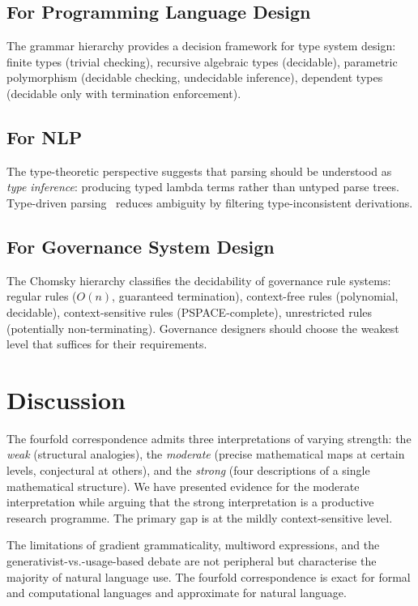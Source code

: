 \documentclass[12pt,a4paper]{article}
\begin{document}
\subsection{For Programming Language Design}

The grammar hierarchy provides a decision framework for type system design:
finite types (trivial checking), recursive algebraic types (decidable),
parametric polymorphism (decidable checking, undecidable inference), dependent
types (decidable only with termination enforcement).

\subsection{For NLP}

The type-theoretic perspective suggests that parsing should be understood as
\emph{type inference}: producing typed lambda terms rather than untyped parse
trees. Type-driven parsing~\cite{BaldridgeKruijff2003} reduces ambiguity by
filtering type-inconsistent derivations.

\subsection{For Governance System Design}

The Chomsky hierarchy classifies the decidability of governance rule systems:
regular rules ($O(n)$, guaranteed termination), context-free rules
(polynomial, decidable), context-sensitive rules (PSPACE-complete),
unrestricted rules (potentially non-terminating). Governance designers should
choose the weakest level that suffices for their requirements.

\section{Discussion}

The fourfold correspondence admits three interpretations of varying strength:
the \emph{weak} (structural analogies), the \emph{moderate} (precise
mathematical maps at certain levels, conjectural at others), and the
\emph{strong} (four descriptions of a single mathematical structure). We have
presented evidence for the moderate interpretation while arguing that the
strong interpretation is a productive research programme. The primary gap is
at the mildly context-sensitive level.

The limitations of gradient grammaticality, multiword expressions, and the
generativist-vs.-usage-based debate are not peripheral but characterise the
majority of natural language use. The fourfold correspondence is exact for
formal and computational languages and approximate for natural language.
\end{document}
